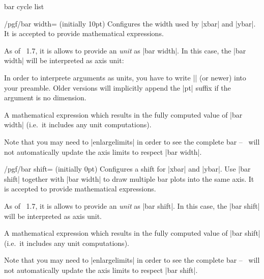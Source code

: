 {\begin{pgfplotskey}{bar cycle list}
\end{pgfplotskey}

\begin{key}{/pgf/bar width= (initially 10pt)}
	Configures the width used by |xbar| and |ybar|. It is accepted to provide mathematical expressions.

	As of \PGFPlots\ 1.7, it is allows to provide an \emph{unit} as |bar width|. In this case, the |bar width| will be interpreted as axis unit:
\begin{codeexample}[]
\end{codeexample}
	In order to interprete arguments as units, you have to write |\pgfplotsset{compat=1.7}| (or newer) into your preamble. Older versions will implicitly append the |pt| suffix if the argument is no dimension.

	\begin{command}{\pgfplotbarwidth}
		A mathematical expression which results in the fully computed value of |bar width| (i.e.\ it includes any unit computations). 
	\end{command}

	Note that you may need to |enlargelimits| in order to see the complete bar -- \PGFPlots\ will not automatically update the axis limits to respect |bar width|.
\end{key}

\begin{key}{/pgf/bar shift= (initially 0pt)}
	Configures a shift for |xbar| and |ybar|. Use |bar shift| together with |bar width| to draw multiple bar plots into the same axis. It is accepted to provide mathematical expressions.

	As of \PGFPlots\ 1.7, it is allows to provide an \emph{unit} as |bar shift|. In this case, the |bar shift| will be interpreted as axis unit.
	\begin{command}{\pgfplotbarshift}
		A mathematical expression which results in the fully computed value of |bar shift| (i.e.\ it includes any unit computations). 
	\end{command}
	Note that you may need to |enlargelimits| in order to see the complete bar -- \PGFPlots\ will not automatically update the axis limits to respect |bar shift|.
\end{key}

}
